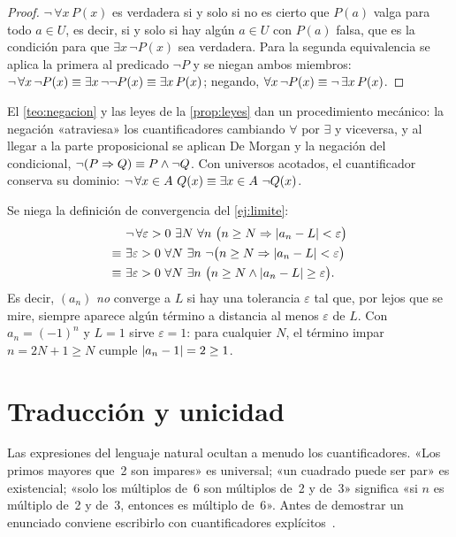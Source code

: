 \begin{proof}
$\neg\,\forall x\,P(x)$ es verdadera si y solo si no es cierto que $P(a)$ valga para todo $a\in U$, es decir, si y solo si hay algún $a\in U$ con $P(a)$ falsa, que es la condición para que $\exists x\,\neg P(x)$ sea verdadera. Para la segunda equivalencia se aplica la primera al predicado $\neg P$ y se niegan ambos miembros: $\neg\,\forall x\,\neg P(x)\equiv\exists x\,\neg\neg P(x)\equiv\exists x\,P(x)$; negando, $\forall x\,\neg P(x)\equiv\neg\,\exists x\,P(x)$.
\end{proof}

El \cref{teo:negacion} y las leyes de la \cref{prop:leyes} dan un procedimiento mecánico: la negación «atraviesa» los cuantificadores cambiando $\forall$ por $\exists$ y viceversa, y al llegar a la parte proposicional se aplican De Morgan y la negación del condicional, $\neg(P\Rightarrow Q)\equiv P\wedge\neg Q$. Con universos acotados, el cuantificador conserva su dominio: $\neg\,\forall x\in A\ Q(x)\eqlog\exists x\in A\ \neg Q(x)$.

\begin{ejemplo}\label{ej:negar-limite}
Se niega la definición de convergencia del \cref{ej:limite}:
\begin{align*}
&\neg\,\forall\varepsilon>0\ \exists N\ \forall n\ \bigl(n\ge N\Rightarrow\abs{a_n-L}<\varepsilon\bigr)\\
\eqlog\ &\exists\varepsilon>0\ \forall N\ \exists n\ \neg\bigl(n\ge N\Rightarrow\abs{a_n-L}<\varepsilon\bigr)\\
\eqlog\ &\exists\varepsilon>0\ \forall N\ \exists n\ \bigl(n\ge N\wedge\abs{a_n-L}\ge\varepsilon\bigr).
\end{align*}
Es decir, $(a_n)$ \emph{no} converge a $L$ si hay una tolerancia $\varepsilon$ tal que, por lejos que se mire, siempre aparece algún término a distancia al menos $\varepsilon$ de $L$. Con $a_n=(-1)^{n}$ y $L=1$ sirve $\varepsilon=1$: para cualquier $N$, el término impar $n=2N+1\ge N$ cumple $\lvert a_n-1\rvert=2\ge 1$.
\end{ejemplo}

\section{Traducción y unicidad}

Las expresiones del lenguaje natural ocultan a menudo los cuantificadores. «Los primos mayores que~2 son impares» es universal; «un cuadrado puede ser par» es existencial; «solo los múltiplos de~6 son múltiplos de~2 y de~3» significa «si $n$ es múltiplo de~2 y de~3, entonces es múltiplo de~6». Antes de demostrar un enunciado conviene escribirlo con cuantificadores explícitos~\cite[§2.9]{hammack}.

